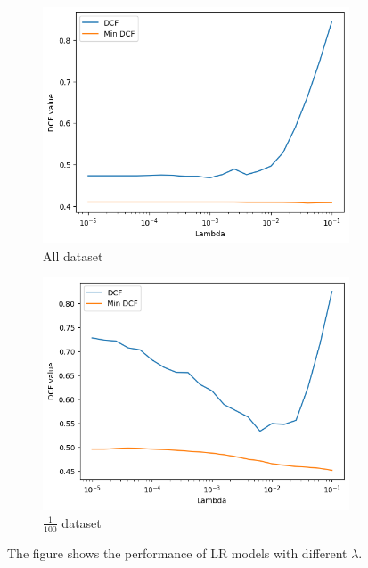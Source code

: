\documentclass{article}
\begin{document}
\begin{figure}[ht]
    \centering
    \begin{subfigure}[b]{0.45\textwidth}
        \centering
        \includegraphics[width=\textwidth]{images/lr_lambda.png}
        \caption{All dataset}
        \label{fig:lr_lambda}
    \end{subfigure}
    \hfill
    \begin{subfigure}[b]{0.45\textwidth}
        \centering
        \includegraphics[width=\textwidth]{images/lr_lambda_100.png}
        \caption{$\frac{1}{100}$ dataset}
        \label{fig:lr_lambda_100}
    \end{subfigure}
    \caption{The figure shows the performance of LR models with different $\lambda$.}
\end{figure}
\end{document}
